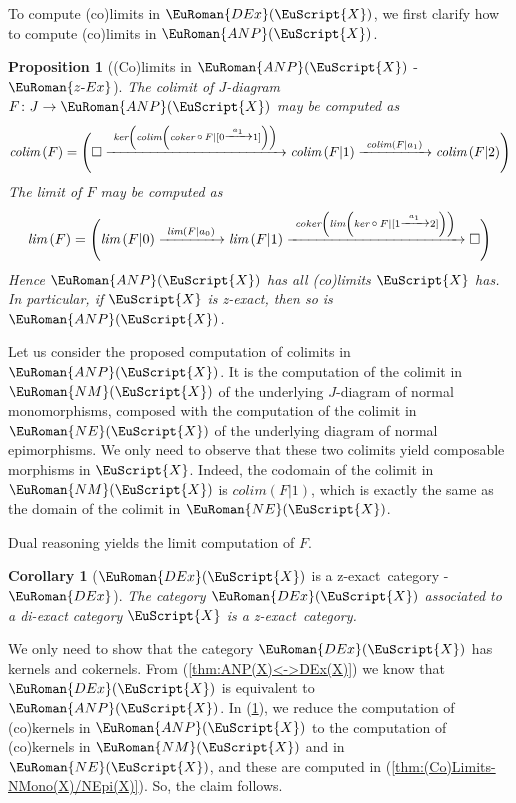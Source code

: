 \documentclass [12pt,oneside]{book}%
\makeatletter
\theoremstyle{captionstyle}  %
\newtheorem{proposition}[theorem]{Proposition}
\newtheorem{corollary}[theorem]{Corollary}
\renewenvironment{proof}[1][\proofname]{\vspace{-2ex}\par       %
	\pushQED{\qed}%
	\normalfont \topsep6\p@\@plus6\p@\relax
	\trivlist
	\item[\hskip\labelsep
	            \color{proofcaption}\bfseries                %
	            #1\@addpunct{\quad}]\ignorespaces
}{%
	\popQED\endtrivlist\@endpefalse
}
\newcommand{\hy}{\text{-}}													%
\newcommand{\XRA}[1]{\xrightarrow{\ #1\ }}
\newcommand{\from}{\colon}				%
\newcommand{\Comp}{\raisebox{0.1ex}{\ensuremath{\,\scriptstyle{\circ}}\,}}
\newcommand{\DiagObj}{\square}
\newcommand{\Ctgry}[1]{\EuScript{#1}}					%
\newcommand{\ZExact}{z-exact}									%
\newcommand{\NMonoCat}[1]{\EuRoman{NM}(\Ctgry{#1})}				%
\newcommand{\NEpiCat}[1]{\EuRoman{NE}(\Ctgry{#1})}				%
\newcommand{\ANPCat}[1]{\EuRoman{ANP}(\EuScript{#1})}							%
\newcommand{\DExCat}[1]{\EuRoman{DEx}(\EuScript{#1})}							%
\newcommand{\CoLimOf}[1]{\textit{colim}\left(#1\right)}		%
\newcommand{\LimOf}[1]{\textit{lim}\left(#1\right)}        			%
\newcommand{\KerFunc}{\textit{ker}}		               	%
\newcommand{\KKerMap}[1]{\textit{ker}\left(#1\right)}		     	%
\newcommand{\CoKerFunc}{\textit{coker}}								%
\newcommand{\CCoKerMap}[1]{\textit{coker}\left(#1\right)}        %
\newcommand{\ZExactTag}{ - {\color{Cerulean} $\EuRoman{z\hy Ex}$}}
\newcommand{\DExTag}{ - {\color{Cerulean} $\EuRoman{DEx}$}}			%
\makeatother
\begin{document}
To compute (co)limits in $\DExCat{X}$, we first clarify how to compute (co)limits in $\ANPCat{X}$.

\begin{proposition}[(Co)limits in $\ANPCat{X}$\ZExactTag]
    \label{thm:ANP(X)-(Co)Limits}%
    The colimit of $J$-diagram $F\from J\to \ANPCat{X}$ may be computed as
    \begin{equation*}
        \CoLimOf{F} = \Biggl(\DiagObj \XRA{\KKerMap{\CoLimOf{\CoKerFunc\Comp F|[0\XRA{a_{1}} 1]}}} \CoLimOf{F|1} \XRA{\CoLimOf{F|a_{1}}} \CoLimOf{F|2}\Biggr)
    \end{equation*}
    The limit of $F$ may be computed as
    \begin{equation*}
        \LimOf{F} = \Biggl(\LimOf{F|0} \XRA{\LimOf{F|a_{0}}} \LimOf{F|1} \XRA{\CCoKerMap{\LimOf{\KerFunc\Comp F|[1\XRA{a_{1}} 2]}} } \DiagObj\Biggr)
    \end{equation*}
    Hence $\ANPCat{X}$ has all (co)limits $\Ctgry{X}$ has. In particular, if $\Ctgry{X}$ is \ZExact, then so is $\ANPCat{X}$.
\end{proposition}
\begin{proof}
    Let us consider the proposed computation of colimits in $\ANPCat{X}$. It is the computation of the colimit in $\NMonoCat{X}$ of the underlying $J$-diagram of normal monomorphisms, composed with the computation of the colimit in $\NEpiCat{X}$ of the underlying diagram of normal epimorphisms. We only need to observe that these two colimits yield composable morphisms in $\EuScript{X}$. Indeed, the codomain of the colimit in $\NMonoCat{X}$ is $\CoLimOf{F|1}$, which is exactly the same as the domain of the colimit in $\NEpiCat{X}$.

    Dual reasoning yields the limit computation of $F$.
\end{proof}

\begin{corollary}[$\DExCat{X}$ is a \ZExact\ category\DExTag]
    \label{thm:DEx(X)Pointed}%
    The category $\DExCat{X}$ associated to a di-exact category $\Ctgry{X}$ is a \ZExact\ category.
\end{corollary}
\begin{proof}
    We only need to show that the category $\DExCat{X}$ has kernels and cokernels. From (\ref{thm:ANP(X)<->DEx(X)}) we know that $\DExCat{X}$ is equivalent to $\ANPCat{X}$. In (\ref{thm:ANP(X)-(Co)Limits}), we reduce the computation of (co)kernels in $\ANPCat{X}$ to the computation of (co)kernels in $\NMonoCat{X}$ and in $\NEpiCat{X}$, and these are computed in  (\ref{thm:(Co)Limits-NMono(X)/NEpi(X)}). So, the claim follows.
\end{proof}
\end{document}
